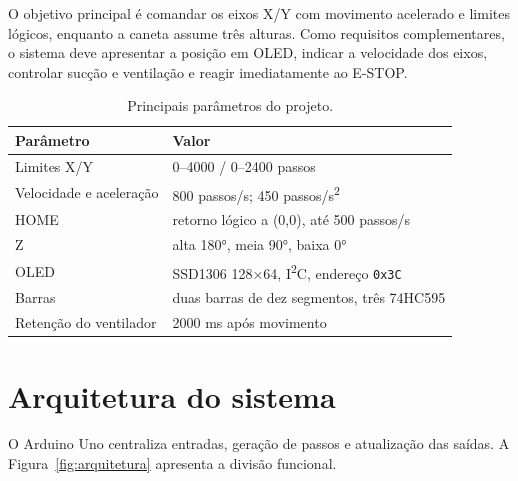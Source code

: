 \documentclass[12pt,a4paper]{article}
\begin{document}
O objetivo principal é comandar os eixos X/Y com movimento acelerado e limites
lógicos, enquanto a caneta assume três alturas. Como requisitos complementares,
o sistema deve apresentar a posição em OLED, indicar a velocidade dos eixos,
controlar sucção e ventilação e reagir imediatamente ao E-STOP.

\begin{table}[htbp]
  \centering
  \caption{Principais parâmetros do projeto.}
  \begin{tabularx}{\textwidth}{@{}YY@{}}
    \toprule
    Parâmetro & Valor \\
    \midrule
    Limites X/Y & 0--4000 / 0--2400 passos \\
    Velocidade e aceleração & 800 passos/s; 450 passos/s\textsuperscript{2} \\
    HOME & retorno lógico a (0,0), até 500 passos/s \\
    Z & alta 180°, meia 90°, baixa 0° \\
    OLED & SSD1306 128×64, I\textsuperscript{2}C, endereço \texttt{0x3C} \\
    Barras & duas barras de dez segmentos, três 74HC595 \\
    Retenção do ventilador & 2000 ms após movimento \\
    \bottomrule
  \end{tabularx}
\end{table}

\section{Arquitetura do sistema}

O Arduino Uno centraliza entradas, geração de passos e atualização das saídas.
A Figura~\ref{fig:arquitetura} apresenta a divisão funcional.
\end{document}
